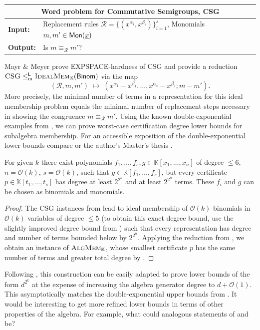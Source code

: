 \documentclass[12pt]{article}
\newcommand{\KK}{\mathbb{K}}
\newcommand\problemBox[4][0.96\textwidth]{
\begin{tabularx}{#1}{lX}
\toprule
\multicolumn{2}{c}{#2} \\ \midrule
\textbf{Input:}    & #3  \\
\textbf{Output:} & #4  \\ \bottomrule
\end{tabularx}
}
\newcommand{\Landau}{\mathcal{O}}
\newcommand{\pclass}[1]{\textsf{\textup{#1}}}
\newcommand{\Mon}{\pclass{Mon}}
\newcommand{\x}{{\underline x}}
\newcommand{\problemText}[1]{\textsc{#1}\xspace}
\newcommand{\IdealMem}{\problemText{IdealMem}}
\newcommand{\AlgMem}{\problemText{AlgMem}}
\newcommand{\CSG}{\problemText{CSG}}
\newcommand{\cclass}[1]{\textsf{\textup{#1}}\xspace}
\newcommand{\EXPSPACE}{\cclass{EXPSPACE}}
\newcommand{\leqlm}{\mathrel{\leq^{\cclass{L}}_{\textup{m}}}}
\begin{document}
\begin{table}[H]
\centering
\problemBox[\textwidth]{Word problem for Commutative Semigroups, \CSG}
{Replacement rules $\mathcal{R} = \{(x^{\alpha_i}, x^{\beta_i})\}_{i=1}^s$, \newline
Monomials $m,m' \in \Mon(\x)$}
{Is $m \equiv_{\mathcal{R}} m'$?}
\end{table}
Mayr \& Meyer \cite{Mayr1982} prove \EXPSPACE-hardness of \CSG and provide a reduction $\CSG \leqlm \IdealMem_\KK(\textsf{Binom})$ via the map
\[
(\mathcal{R},m,m')\;\mapsto\;(x^{\alpha_1}-x^{\beta_1},\dots,x^{\alpha_s}-x^{\beta_s};m-m').
\]
More precisely, the minimal number of terms in a representation for this ideal membership problem equals the minimal number of replacement steps necessary in showing the congruence $m \equiv_{\mathcal R} m'$. Using the known double-exponential examples from \cite{Mayr1982}, we can prove worst-case certification degree lower bounds for subalgebra membership. For an accessible exposition of the double-exponential lower bounds compare \cite{Bayer1988} or the author's Master's thesis \cite{kayser2022groebnercomplexity}.

\begin{theorem}
For given $k$ there exist polynomials $f_1,\dots,f_s,g \in \KK[x_1,\dots,x_n]$ of degree $\leq 6$, $n = \Landau(k)$, $s = \Landau(k)$, such that $g \in \KK[f_1,\dots,f_s]$, but every certificate $p \in \KK[t_1,\dots,t_s]$ has degree at least $2^{2^n}$ and at least $2^{2^n}$ terms. These $f_i$ and $g$ can be chosen as binomials and monomials.
\end{theorem}
\begin{proof}
The \CSG instances from \cite{Mayr1982} lead to ideal membership of $\Landau(k)$ binomials in $\Landau(k)$ variables of degree $\leq 5$ (to obtain this exact degree bound, use the slightly improved degree bound from \cite{Bayer1988}) such that every representation has degree and number of terms bounded below by $2^{2^n}$. Applying the reduction from , we obtain an instance of $\AlgMem_\KK$, whose smallest certificate $p$ has the same number of terms and greater total degree by .
\end{proof}

\begin{remark}
Following \cite{Bayer1988}, this construction can be easily adapted to prove lower bounds of the form $d^{2^k}$ at the expense of increasing the algebra generator degree to $d+ \Landau(1)$. This asymptotically matches the double-exponential upper bounds from . It would be interesting to get more refined lower bounds in terms of other properties of the algebra. For example, what could analogous statements of  and  be?
\end{remark}
\end{document}
